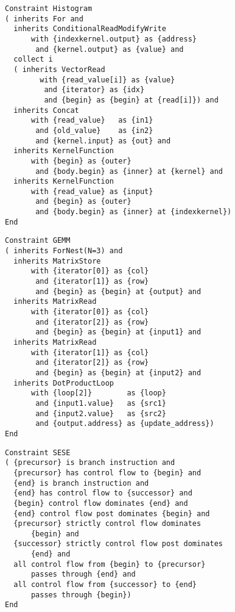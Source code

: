 \begin{figure}[p]
\begin{lstlisting}[language={constraints},
                   label={fig:histogram},caption=
   {IDL specification of generalized histogram}]
Constraint Histogram
( inherits For and
  inherits ConditionalReadModifyWrite
      with {indexkernel.output} as {address}
       and {kernel.output} as {value} and
  collect i
  ( inherits VectorRead
        with {read_value[i]} as {value}
         and {iterator} as {idx}
         and {begin} as {begin} at {read[i]}) and
  inherits Concat
      with {read_value}   as {in1}
       and {old_value}    as {in2}
       and {kernel.input} as {out} and
  inherits KernelFunction
      with {begin} as {outer}
       and {body.begin} as {inner} at {kernel} and
  inherits KernelFunction
      with {read_value} as {input}
       and {begin} as {outer}
       and {body.begin} as {inner} at {indexkernel})
End
\end{lstlisting}
\end{figure}

\begin{figure}[p]
\begin{lstlisting}[language={constraints},
                   label={fig:gemm},caption={IDL specification of GEMM}]
Constraint GEMM
( inherits ForNest(N=3) and
  inherits MatrixStore
      with {iterator[0]} as {col}
       and {iterator[1]} as {row}
       and {begin} as {begin} at {output} and
  inherits MatrixRead
      with {iterator[0]} as {col}
       and {iterator[2]} as {row}
       and {begin} as {begin} at {input1} and
  inherits MatrixRead
      with {iterator[1]} as {col}
       and {iterator[2]} as {row}
       and {begin} as {begin} at {input2} and
  inherits DotProductLoop
      with {loop[2]}        as {loop}
       and {input1.value}   as {src1}
       and {input2.value}   as {src2}
       and {output.address} as {update_address})
End
\end{lstlisting}
\end{figure}

\begin{figure}[p]
\begin{lstlisting}[language={constraints},
                   label={fig:sese},caption={IDL specification of SESE region}]
Constraint SESE
( {precursor} is branch instruction and
  {precursor} has control flow to {begin} and
  {end} is branch instruction and
  {end} has control flow to {successor} and
  {begin} control flow dominates {end} and
  {end} control flow post dominates {begin} and
  {precursor} strictly control flow dominates
      {begin} and
  {successor} strictly control flow post dominates
      {end} and
  all control flow from {begin} to {precursor}
      passes through {end} and
  all control flow from {successor} to {end}
      passes through {begin})
End
\end{lstlisting}
\end{figure}

